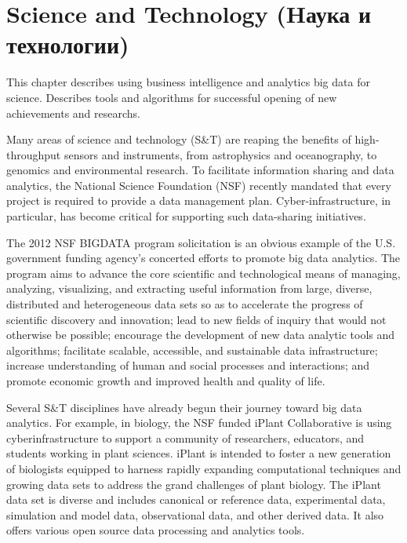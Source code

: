 \section{Science and Technology (Hаука и технологии)}

This chapter describes using business intelligence and analytics big data for science. Describes tools and algorithms for successful opening of new achievements and researchs.

Many areas of science and technology (S\&T) are reaping the
benefits of high-throughput sensors and instruments, from
astrophysics and oceanography, to genomics and environmental
research. To facilitate information sharing and data
analytics, the National Science Foundation (NSF) recently
mandated that every project is required to provide a data
management plan. Cyber-infrastructure, in particular, has
become critical for supporting such data-sharing initiatives.

The 2012 NSF BIGDATA program solicitation is an obvious
example of the U.S. government funding agency’s concerted
efforts to promote big data analytics. The program
aims to advance the core scientific and technological
means of managing, analyzing, visualizing, and extracting
useful information from large, diverse, distributed
and heterogeneous data sets so as to accelerate
the progress of scientific discovery and innovation;
lead to new fields of inquiry that would not
otherwise be possible; encourage the development of
new data analytic tools and algorithms; facilitate
scalable, accessible, and sustainable data infrastructure;
increase understanding of human and social
processes and interactions; and promote economic
growth and improved health and quality of life.

Several S\&T disciplines have already begun their journey
toward big data analytics. For example, in biology, the NSF
funded iPlant Collaborative is using cyberinfrastructure to
support a community of researchers, educators, and students
working in plant sciences. iPlant is intended to foster a new
generation of biologists equipped to harness rapidly expanding
computational techniques and growing data sets to
address the grand challenges of plant biology. The iPlant data
set is diverse and includes canonical or reference data,
experimental data, simulation and model data, observational
data, and other derived data. It also offers various open
source data processing and analytics tools.

